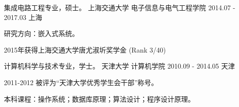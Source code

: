 \begin{cventries}
  \cventry
    {集成电路工程专业，硕士。}
    {上海交通大学 \quad 电子信息与电气工程学院}
    {2014.07 - 2017.03}
    {上海}
    {
      \begin{cvitems}
        \item {研究方向：嵌入式系统。}
        \item {2015年获得上海交通大学唐尤淑圻奖学金 (Rank 3/40)}
      \end{cvitems}
    }
    \cventry
    {计算机科学与技术专业，学士。}
    {天津大学 \quad 计算机学院}
    {2010.09 - 2014.05}
    {天津}
    {
      \begin{cvitems}
        \item {2011-2012 被评为“天津大学优秀学生会干部”称号。}
        \item {本科课程：操作系统；数据库原理；算法设计；程序设计原理。}
      \end{cvitems}
    }
\end{cventries}
